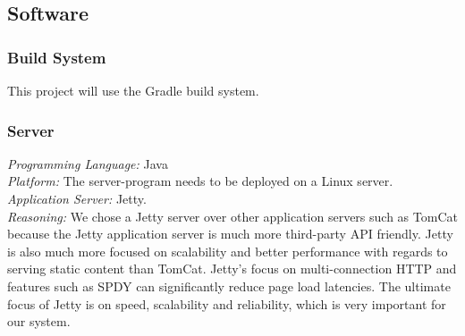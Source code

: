 \subsection{Software}

\subsubsection{Build System}
This project will use the Gradle build system.

\subsubsection{Server}
\textit{Programming Language:} Java \\
\textit{Platform:} The server-program needs to be deployed on a Linux server.\\
\textit{Application Server:} Jetty.\\
\textit{Reasoning: } We chose a Jetty server over other application servers such as TomCat because the Jetty application server is much more third-party API friendly. Jetty is also much more focused on scalability and better performance with regards to serving static content than TomCat. Jetty's focus on multi-connection HTTP and features such as SPDY can significantly reduce page load latencies. The ultimate focus of Jetty is on speed, scalability and reliability, which is very important for our system.

